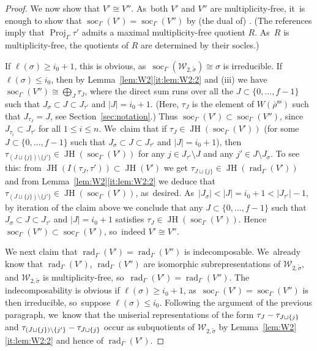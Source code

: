\documentclass[JEP,XML,SOM,Unicode,NoFloatCountersInSection, NoEqCountersInSection,published]{cedram}
\let\wt\widetilde
\newcommand{\cW}{\mathcal{W}}
\renewcommand{\ss}{\mathrm{ss}}
\newcommand{\brho}{\overline{\rho}}
\DeclareMathOperator{\JH}{\mathrm{JH}}
\DeclareMathOperator{\Proj}{Proj}
\DeclareMathOperator{\rad}{rad}
\DeclareMathOperator{\soc}{soc}
\theoremstyle{plain}
\theoremstyle{definition}
\begin{document}
\begin{proof}
We now show that $V' \cong V''$. As~both $V'$ and $V''$ are multiplicity-free, it~is enough to show that $\soc_\Gamma(V') = \soc_\Gamma(V'')$ by (the dual of) \cite[Prop.\,3.6, Cor.\ 3.11]{BP}.
(The references imply that $\Proj_{\Gamma}\tau'$ admits a maximal multiplicity-free quotient $R$. As~$R$ is multiplicity-free, the quotients of $R$ are determined by their socles.)

If $\ell(\sigma) \ge i_0+1$, this is obvious, as~$\soc_\Gamma(\mathcal{W}_{2,\wt\sigma}) \cong \sigma$ is irreducible.
If $\ell(\sigma) \le i_0$, then by Lemma~\ref{lem:W2}\eqref{it:lem:W2:2} and (iii)
we have $\soc_\Gamma(V'') \cong \bigoplus_J \tau_J$, where the direct sum runs over all the $J\subset\{0,\dots,f-1\}$ such that $J_\sigma \subset J \subset J_{\tau'}$ and $|J| = i_0+1$.
(Here, $\tau_J$ is the element of $W(\brho^\ss)$ such that $J_{\tau_J} = J$, see Section~\ref{sec:notation}.)
Thus $\soc_\Gamma(V') \subset \soc_\Gamma(V'')$, since $J_{\tau_i} \subset J_{\tau'}$ for all $1 \le i \le n$. We~claim that if $\tau_J \in \JH(\soc_\Gamma(V'))$ (for some $J\subset\{0,\dots,f-1\}$ such that $J_\sigma \subset J \subset J_{\tau'}$ and $|J| = i_0+1$), then $\tau_{(J \sqcup \{j\}) \setminus \{j'\}} \in \JH(\soc_\Gamma(V'))$ for any $j \in J_{\tau'} \setminus J$ and any $j' \in J\setminus J_\sigma$.
To see this: from $\JH(I(\tau_J,\tau')) \subset \JH(V')$ we get $\tau_{J \sqcup \{j\}} \in \JH(\rad_\Gamma(V'))$ and from Lemma~\ref{lem:W2}\eqref{it:lem:W2:2} we deduce that $\tau_{(J \sqcup \{j\}) \setminus \{j'\}} \in \JH(\soc_\Gamma(V'))$, as~desired. As~$|J_\sigma| < |J| = i_0+1 < |J_{\tau'}|-1$, by iteration of the claim above we conclude that any $J\subset\{0,\dots,f-1\}$ such that $J_\sigma \subset J \subset J_{\tau'}$ and $|J| = i_0+1$ satisfies $\tau_J \in \JH(\soc_\Gamma(V'))$.
Hence $\soc_\Gamma(V'') \subset \soc_\Gamma(V')$, so~indeed $V' \cong V''$.

We next claim that $\rad_\Gamma(V') = \rad_\Gamma(V'')$ is indecomposable. We~already know that $\rad_\Gamma(V')$, $\rad_\Gamma(V'')$ are isomorphic subrepresentations of $\mathcal{W}_{2,\wt\sigma}$, and $\mathcal{W}_{2,\wt\sigma}$ is multiplicity-free, so~$\rad_\Gamma(V') = \rad_\Gamma(V'')$.
The indecomposability is obvious if $\ell(\sigma) \ge i_0+1$, as~$\soc_\Gamma(V')=\soc_\Gamma(V'')$ is then irreducible, so~suppose $\ell(\sigma) \le i_0$.
Following the argument of the previous paragraph, we~know that the uniserial representations of the form $\tau_J \-- \tau_{J \sqcup \{j\}}$ and $\tau_{(J \sqcup \{j\}) \setminus \{j'\}} \-- \tau_{J \sqcup \{j\}}$ occur as subquotients of $\cW_{2,\wt\sigma}$ by Lemma~\ref{lem:W2}\eqref{it:lem:W2:2} and hence of $\rad_\Gamma(V')$.


\end{proof}
\end{document}
